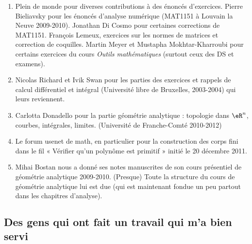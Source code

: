 \begin{enumerate}
	\item
	      Plein de monde pour diverses contributions à des énoncés d'exercices. Pierre Bieliavsky pour les énoncés d'analyse numérique (MAT1151 à Louvain la Neuve 2009-2010). Jonathan Di Cosmo pour certaines corrections de MAT1151. François Lemeux, exercices sur les normes de matrices et correction de coquilles.  Martin Meyer et Mustapha Mokhtar-Kharroubi pour certains exercices du cours \emph{Outils mathématiques} (surtout ceux des DS et examens).
	\item
	      Nicolas Richard et Ivik Swan pour les parties des exercices et rappels de calcul différentiel et intégral (Université libre de Bruxelles, 2003-2004) qui leurs reviennent.
	\item
	      Carlotta Donadello pour la partie géométrie analytique : topologie dans \( \eR^n\), courbes, intégrales, limites. (Université de Franche-Comté 2010-2012)
	\item
	      Le forum usenet de math, en particulier pour la construction des corps fini dans le fil « Vérifier qu'un polynôme est primitif » initié le 20 décembre 2011.
	\item
	      Mihai Bostan nous a donné ses notes manuscrites de son cours présentiel de géométrie analytique 2009-2010. (Presque) Toute la structure du cours de géométrie analytique lui est due (qui est maintenant fondue un peu partout dans les chapitres d'analyse).
\end{enumerate}

\subsection{Des gens qui ont fait un travail qui m'a bien servi}
\label{SUBooINTROremerciementsAutres}

